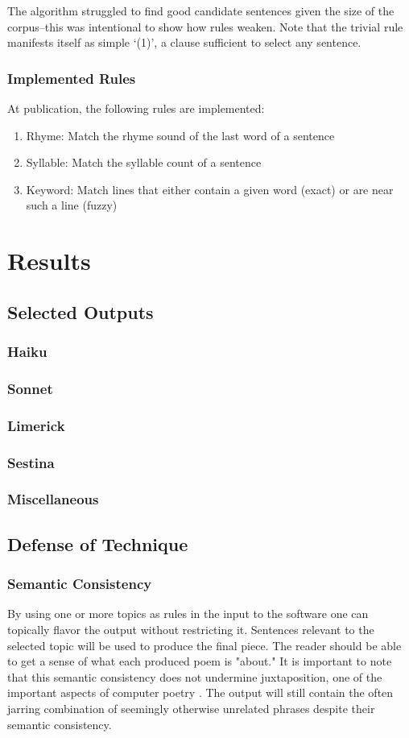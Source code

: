 \documentclass[10pt]{article}
\begin{document}
The algorithm struggled to find good candidate sentences given the size of the
corpus--this was intentional to show how rules weaken. Note that the trivial
rule manifests itself as simple `(1)', a clause sufficient to select any
sentence.

\subsubsection{Implemented Rules}
At publication, the following rules are implemented:
\onehalfspacing
\begin{enumerate}
\item Rhyme: Match the rhyme sound of the last word of a sentence
\item Syllable: Match the syllable count of a sentence
\item Keyword: Match lines that either contain a given word (exact) or are near such a line (fuzzy)
\end{enumerate}
\doublespacing

\section{Results}
\subsection{Selected Outputs}
\subsubsection{Haiku}
\subsubsection{Sonnet}
\subsubsection{Limerick}
\subsubsection{Sestina}
\subsubsection{Miscellaneous}
\subsection{Defense of Technique}

\subsubsection{Semantic Consistency}
By using one or more topics as rules in the input to the software one can
topically flavor the output without restricting it. Sentences relevant to the
selected topic will be used to produce the final piece. The reader should be
able to get a sense of what each produced poem is "about." It is important to
note that this semantic consistency does not undermine juxtaposition, one of
the important aspects of computer poetry \cite{Hart96}. The output will still
contain the often jarring combination of seemingly otherwise unrelated phrases
despite their semantic consistency.
\end{document}
